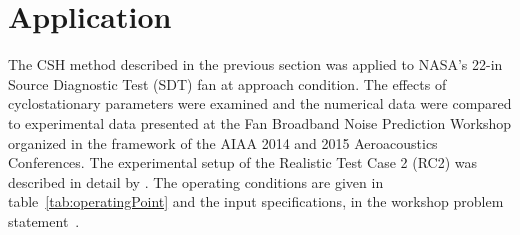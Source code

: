 \section{Application}\label{sec:Application}


The CSH method described in the previous section was applied to NASA's 22-in Source Diagnostic Test (SDT) fan at approach condition.  The effects of cyclostationary parameters were examined and the numerical data were compared to experimental data presented at the Fan Broadband Noise Prediction Workshop organized in the framework of the AIAA 2014 and 2015 Aeroacoustics Conferences.  The experimental setup of the Realistic Test Case 2 (RC2) was described in detail by \citet{nallasamy_computation_2005}.  The operating conditions are given in table~\ref{tab:operatingPoint} and the input specifications, in the workshop problem statement~\cite{envia_panel_2015}.    


